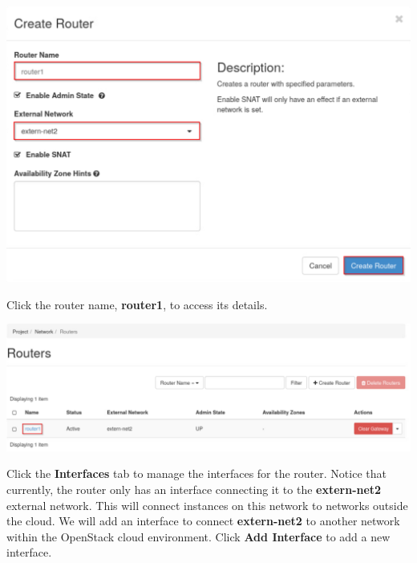 \documentclass[letterpaper, 12pt]{article}
\begin{document}
\begin{enumerate}
\begin{labstep}
        \begin{center}
            \includegraphics[width=\linewidth]{images/part2/step3.png}
        \end{center}
    \end{labstep}

    \begin{labstep}
        Click the router name, \textbf{router1}, to access its details.

        \begin{center}
            \includegraphics[width=\linewidth]{images/part2/step4.png}
        \end{center}
    \end{labstep}

    \begin{labstep}
        Click the \textbf{Interfaces} tab to manage the interfaces for the router.
        Notice that currently, the router only has an interface connecting it to the \textbf{extern-net2} external network.
        This will connect instances on this network to networks outside the cloud.
        We will add an interface to connect \textbf{extern-net2} to another network within the OpenStack cloud environment.
        Click \textbf{Add Interface} to add a new interface.


\end{labstep}
\end{enumerate}
\end{document}
